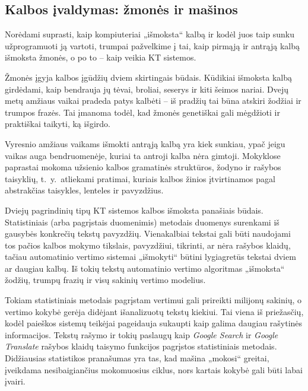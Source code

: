 \begin{multicols}{2}
\subsection{Kalbos įvaldymas: žmonės ir mašinos}

Norėdami suprasti, kaip kompiuteriai „išmoksta“ kalbą ir kodėl juos taip sunku užprogramuoti ją vartoti, trumpai pažvelkime į tai, kaip pirmąją ir antrąją kalbą išmoksta žmonės, o po to – kaip veikia KT sistemos.

Žmonės įgyja kalbos įgūdžių dviem skirtingais būdais. Kūdikiai išmoksta kalbą girdėdami, kaip bendrauja jų tėvai, broliai, seserys ir kiti šeimos nariai. Dvejų metų amžiaus vaikai pradeda patys kalbėti – iš pradžių tai būna atskiri žodžiai ir trumpos frazės. Tai įmanoma  todėl, kad žmonės  genetiškai gali mėgdžioti ir praktiškai taikyti, ką išgirdo.

Vyresnio amžiaus vaikams išmokti antrąją kalbą yra kiek sunkiau, ypač jeigu vaikas auga bendruomenėje, kuriai ta antroji kalba nėra gimtoji. Mokyklose paprastai mokoma užsienio kalbos gramatinės struktūros, žodyno ir rašybos taisyklių, t.~y.~atliekami pratimai, kuriais kalbos žinios įtvirtinamos pagal abstrakčias taisykles, lenteles ir pavyzdžius. 

Dviejų pagrindinių tipų KT sistemos kalbos išmoksta panašiais būdais. Statistiniais (arba pagrįstais duomenimis) metodais duomenys surenkami iš gausybės konkrečių tekstų pavyzdžių. Vienakalbiai tekstai gali būti naudojami tos pačios kalbos mokymo tikslais, pavyzdžiui, tikrinti, ar nėra rašybos klaidų, tačiau automatinio vertimo sistemai „išmokyti“ būtini lygiagretūs tekstai dviem ar daugiau kalbų. Iš tokių tekstų automatinio vertimo algoritmas „išmoksta“ žodžių, trumpų frazių ir visų sakinių vertimo modelius. 


Tokiam statistiniais metodais pagrįstam vertimui gali prireikti milijonų sakinių, o vertimo kokybė gerėja didėjant išanalizuotų tekstų kiekiui. Tai viena iš priežasčių, kodėl paieškos sistemų teikėjai pageidauja sukaupti kaip galima daugiau rašytinės informacijos. Tekstų rašymo ir tokių paslaugų kaip \textit{Google Search} ir \textit{Google Translate} rašybos klaidų taisymo funkcijos pagrįstos statistiniais metodais. Didžiausias statistikos pranašumas yra tas, kad mašina „mokosi“ greitai, įveikdama nesibaigiančius mokomuosius ciklus, nors kartais kokybė gali būti labai įvairi.


\end{multicols}
